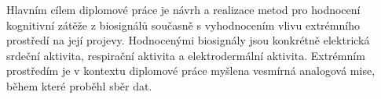 Hlavním cílem diplomové práce je návrh a realizace metod pro hodnocení
kognitivní zátěže z biosignálů současně s vyhodnocením vlivu extrémního
prostředí na její projevy. Hodnocenými biosignály jsou konkrétně elektrická
srdeční aktivita, respirační aktivita a elektrodermální aktivita. Extrémním
prostředím je v kontextu diplomové práce myšlena vesmírná analogová mise, během
které proběhl sběr dat.
